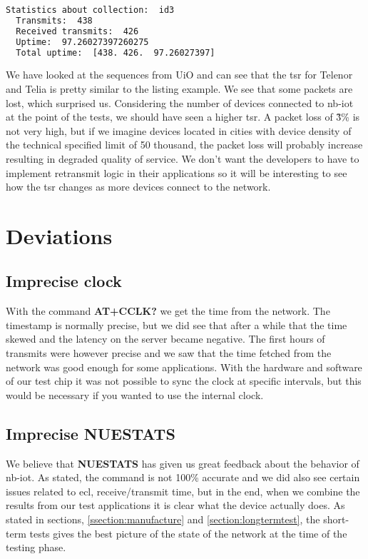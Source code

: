 \documentclass[USenglish]{ifimaster}  %
\begin{document}
\begin{lstlisting}[caption={uptime.py example}, label={code:uptimerun}, language=Bash]
  Statistics about collection:  id3
  Transmits:  438
  Received transmits:  426
  Uptime:  97.26027397260275
  Total uptime:  [438. 426.  97.26027397]
\end{lstlisting}

We have looked at the sequences from UiO and can see that the \acrshort{tsr} for Telenor and Telia is pretty similar to the listing example. We see that some packets are lost, which surprised us. Considering the number of devices connected to \acrshort{nb-iot} at the point of the tests, we should have seen a higher \acrshort{tsr}. A packet loss of \~3\% is not very high, but if we imagine devices located in cities with device density of the technical specified limit of 50 thousand, the packet loss will probably increase resulting in degraded quality of service. We don't want the developers to have to implement retransmit logic in their applications so it will be interesting to see how the \acrshort{tsr} changes as more devices connect to the network.



\chapter{Deviations} \label{section:deviations}
\section{Imprecise clock}
With the command \textbf{AT+CCLK?} we get the time from the network. The timestamp is normally precise, but we did see that after a while that the time skewed and the latency on the server became negative. The first hours of transmits were however precise and we saw that the time fetched from the network was good enough for some applications. With the hardware and software of our test chip it was not possible to sync the clock at specific intervals, but this would be necessary if you wanted to use the internal clock.

\section{Imprecise \textbf{NUESTATS}}
We believe that \textbf{NUESTATS} has given us great feedback about the behavior of \acrshort{nb-iot}. As stated, the command is not 100\% accurate and we did also see certain issues related to \acrshort{ecl}, receive/transmit time, but in the end, when we combine the results from our test applications it is clear what the device actually does. As stated in sections, \vref{ssection:manufacture} and \vref{section:longtermtest}, the short-term tests gives the best picture of the state of the network at the time of the testing phase.
\end{document}

